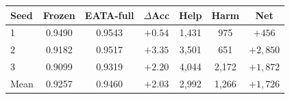 \footnotesize
\setlength{\tabcolsep}{2.5pt}
\begin{tabular}{lcccccc}
\toprule
Seed & Frozen & EATA-full & $\Delta$Acc & Help & Harm & Net \\
\midrule
1 & 0.9490 & 0.9543 & $+0.54$ & 1{,}431 & 975 & $+456$ \\
2 & 0.9182 & 0.9517 & $+3.35$ & 3{,}501 & 651 & $+2{,}850$ \\
3 & 0.9099 & 0.9319 & $+2.20$ & 4{,}044 & 2{,}172 & $+1{,}872$ \\
\midrule
Mean & 0.9257 & 0.9460 & $+2.03$ & 2{,}992 & 1{,}266 & $+1{,}726$ \\
\bottomrule
\end{tabular}
